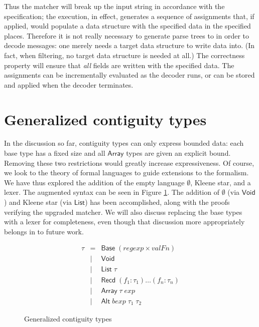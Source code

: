 \documentclass[a4paper,UKenglish,cleveref, autoref, thm-restate]{lipics-v2021}
\newcommand{\konst}[1]{\ensuremath{\mathsf{#1}}}
\begin{document}
Thus the matcher will break up the input string in accordance with the
specification; the execution, in effect, generates a sequence of
assignments that, if applied, would populate a data structure with the
specified data in the specified places. Therefore it is not really
necessary to generate parse trees to in order to decode messages: one
merely needs a target data structure to write data into. (In fact,
when filtering, no target data structure is needed at all.) The
correctness property will ensure that \emph{all} fields are written
with the specified data. The assignments can be incrementally
evaluated as the decoder runs, or can be stored and applied when the
decoder terminates.


\section{Generalized contiguity types}

In the discussion so far, contiguity types can only express bounded
data: each base type has a fixed size and all \konst{Array} types are
given an explicit bound. Removing these two restrictions would greatly
increase expressiveness. Of course, we look to the theory of formal
languages to guide extensions to the formalism. We have thus explored
the addition of the empty language $\emptyset$, Kleene star, and a
lexer. The augmented syntax can be seen in Figure
\ref{gen-contig-types}. The addition of $\emptyset$ (via \konst{Void})
and Kleene star (via \konst{List}) has been accomplished, along with
the proofs verifying the upgraded matcher. We will also discuss replacing the
base types with a lexer for completeness, even though that discussion
more appropriately belongs in to future work.

\begin{figure}
\[
\begin{array}{rcl}
 \tau & =    & \konst{Base}\; (\mathit{regexp} \times \mathit{valFn}) \\
      & \mid & \konst{Void} \\
      & \mid & \konst{List}\; \tau \\
      & \mid & \konst{Recd}\; (f_1 : \tau_1) \ldots (f_n : \tau_n) \\
      & \mid & \konst{Array}\; \tau \; \mathit{exp} \\
      & \mid & \konst{Alt}\; \mathit{bexp} \; \tau_1\; \tau_2
\end{array}
\]
\caption{Generalized contiguity types}
\label{gen-contig-types}
\end{figure}
\end{document}
